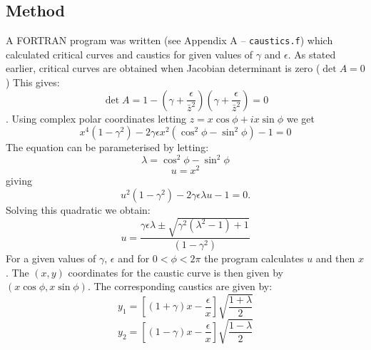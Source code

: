 \documentclass[a4paper]{IEEEtran}
\begin{document}
    \subsection{Method}
    A FORTRAN program was written (see Appendix A -- \texttt{caustics.f})
    which calculated critical curves and caustics for given
    values of $\gamma$ and $\epsilon$. As stated earlier, critical
    curves are obtained when Jacobian determinant is zero ($\det A = 0$)
    This gives:
    \begin{equation}
        \det A = 1 - \left( \gamma + \frac{\epsilon}{\bar{z}^2} \right)
                     \left( \gamma + \frac{\epsilon}{\bar{z}^2} \right) = 0
    \end{equation}.
    Using complex polar coordinates letting $z = x \cos \phi + ix \sin \phi$
    we get
    \begin{equation}
        x^4 (1 - \gamma^2) - 2 \gamma \epsilon x^2 
            (\cos^2\phi - \sin^2\phi) - 1 = 0
    \end{equation}
    The equation can be parameterised by letting:
        \[ \lambda = \cos^2\phi - \sin^2\phi \]
        \[ u = x^2 \]
    giving
    \begin{equation}
        u^2(1 - \gamma^2) - 2\gamma \epsilon \lambda u - 1 = 0.
    \end{equation}
    Solving this quadratic we obtain:
    \begin{equation}
        u = \frac{\gamma\epsilon\lambda \pm \sqrt{\gamma^2(\lambda^2 - 1) + 1}}
                 {(1 - \gamma^2)}
    \end{equation}
    For a given values of $\gamma$, $\epsilon$ and for $0 < \phi < 2\pi$
    the program calculates $u$ and then $x$. The $(x,y)$ coordinates
    for the caustic curve is then given by $(x\cos\phi, x\sin\phi)$.
    The corresponding caustics are given by:
    \begin{equation}
        y_1 = \left[ (1 + \gamma)x - \frac{\epsilon}{x} \right] 
              \sqrt{\frac{1 + \lambda}{2} } 
    \end{equation}
    \begin{equation}
       y_2 = \left[ (1 - \gamma)x - \frac{\epsilon}{x} \right] 
                     \sqrt{\frac{1 - \lambda}{2} }
    \end{equation}
\end{document}

